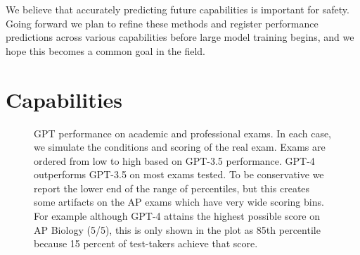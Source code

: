 \documentclass{article}
\begin{document}
We believe that accurately predicting future capabilities is important for safety. Going forward we plan to refine these methods and register performance predictions across various capabilities before large model training begins, and we hope this becomes a common goal in the field.

\section{Capabilities}

\begin{figure}[!htbp]
    \centering
    \caption{GPT performance on academic and professional exams. In each case, we simulate the conditions and scoring of the real exam. Exams are ordered from low to high based on GPT-3.5 performance. GPT-4 outperforms GPT-3.5 on most exams tested. To be conservative we report the lower end of the range of percentiles, but this creates some artifacts on the AP exams which have very wide scoring bins. For example although GPT-4 attains the highest possible score on AP Biology (5/5), this is only shown in the plot as 85th percentile because 15 percent of test-takers achieve that score. }
    \label{fig:exams}
\end{figure}
\end{document}
